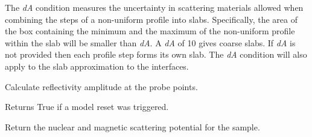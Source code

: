 \documentclass[letterpaper,10pt,english]{sphinxmanual}
\begin{document}
\begin{fulllineitems}
The \emph{dA} condition measures the uncertainty in scattering materials
allowed when combining the steps of a non-uniform profile into slabs.
Specifically, the area of the box containing the minimum and the
maximum of the non-uniform profile within the slab will be smaller
than \emph{dA}.  A \emph{dA} of 10 gives coarse slabs.  If \emph{dA} is not provided
then each profile step forms its own slab.  The \emph{dA} condition will
also apply to the slab approximation to the interfaces.

\begin{fulllineitems}
\label{api/experiment:refl1d.experiment.Experiment.amplitude}
Calculate reflectivity amplitude at the probe points.

\end{fulllineitems}


\begin{fulllineitems}
\label{api/experiment:refl1d.experiment.Experiment.format_parameters}
\end{fulllineitems}


\begin{fulllineitems}
\label{api/experiment:refl1d.experiment.Experiment.is_reset}
Returns True if a model reset was triggered.

\end{fulllineitems}


\begin{fulllineitems}
\label{api/experiment:refl1d.experiment.Experiment.ismagnetic}
\end{fulllineitems}


\begin{fulllineitems}
\label{api/experiment:refl1d.experiment.Experiment.magnetic_profile}
Return the nuclear and magnetic scattering potential for the sample.


\end{fulllineitems}
\end{fulllineitems}
\end{document}
